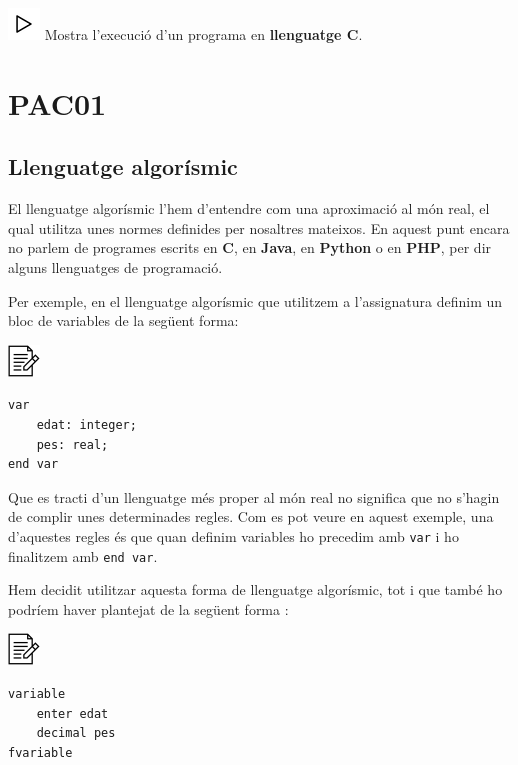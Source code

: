 \documentclass[]{book}
\begin{document}
\includegraphics{./img/play.png} Mostra l'execució d'un programa en
\textbf{llenguatge C}.

\chapter{PAC01}\label{pac01}

\section{Llenguatge algorísmic}\label{llenguatge-algorismic}

El llenguatge algorísmic l'hem d'entendre com una aproximació al món
real, el qual utilitza unes normes definides per nosaltres mateixos. En
aquest punt encara no parlem de programes escrits en \textbf{C}, en
\textbf{Java}, en \textbf{Python} o en \textbf{PHP}, per dir alguns
llenguatges de programació.

Per exemple, en el llenguatge algorísmic que utilitzem a l'assignatura
definim un bloc de variables de la següent forma:

\includegraphics{./img/alg.png}

\begin{verbatim}
var
    edat: integer;
    pes: real;
end var
\end{verbatim}

Que es tracti d'un llenguatge més proper al món real no significa que no
s'hagin de complir unes determinades regles. Com es pot veure en aquest
exemple, una d'aquestes regles és que quan definim variables ho precedim
amb \texttt{var} i ho finalitzem amb \texttt{end\ var}.

Hem decidit utilitzar aquesta forma de llenguatge algorísmic, tot i que
també ho podríem haver plantejat de la següent forma :

\includegraphics{./img/alg.png}

\begin{verbatim}
variable
    enter edat
    decimal pes
fvariable
\end{verbatim}
\end{document}
